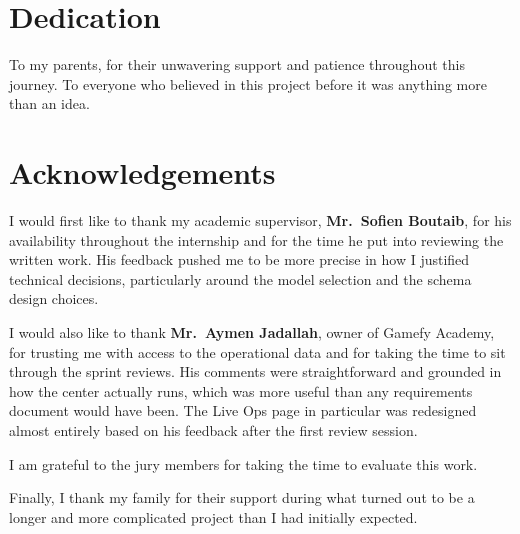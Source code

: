 \documentclass[12pt, a4paper]{report}
\begin{document}
\chapter*{Dedication}
\thispagestyle{empty}

\vspace*{3cm}
\begin{center}
\itshape


To my parents, for their unwavering support and patience throughout this journey.
To everyone who believed in this project before it was anything more than an idea.

\end{center}

\newpage

\chapter*{Acknowledgements}

I would first like to thank my academic supervisor, \textbf{Mr.\ Sofien Boutaib},
for his availability throughout the internship and for the time he put into
reviewing the written work. His feedback pushed me to be more precise in how I
justified technical decisions, particularly around the model selection and the
schema design choices.

I would also like to thank \textbf{Mr.\ Aymen Jadallah}, owner of Gamefy Academy,
for trusting me with access to the operational data and for taking the time to sit
through the sprint reviews. His comments were straightforward and grounded in how
the center actually runs, which was more useful than any requirements document would
have been. The Live Ops page in particular was redesigned almost entirely based on
his feedback after the first review session.

I am grateful to the jury members for taking the time to evaluate this work.

Finally, I thank my family for their support during what turned out to be a longer
and more complicated project than I had initially expected.
\end{document}
